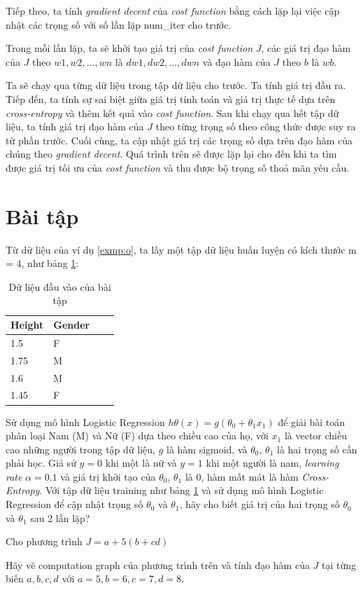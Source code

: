 Tiếp theo, ta tính \textit{gradient decent} của \textit{cost function} bằng cách lặp lại việc cập nhật các trọng số với số lần lặp num\_iter cho trước.

Trong mỗi lần lặp, ta sẽ khởi tạo giá trị của \textit{cost function} $J$, các giá trị đạo hàm của $J$ theo $w1, w2, ..., wn$ là $dw1, dw2, ..., dwn$ và đạo hàm của $J$ theo $b$ là $wb$.

Ta sẽ chạy qua từng dữ liệu trong tập dữ liệu cho trước. Ta tính giá trị đầu ra. Tiếp đến, ta tính sự sai biệt giữa giá trị tính toán và giá trị thực tế dựa trên \textit{cross-entropy} và thêm kết quả vào \textit{cost function}. Sau khi chạy qua hết tập dữ liệu, ta tính giá trị đạo hàm của $J$ theo từng trọng số theo công thức được suy ra từ phần trước. Cuối cùng, ta cập nhật giá trị các trọng số dựa trên đạo hàm của chúng theo \textit{gradient decent}. Quá trình trên sẽ được lặp lại cho đến khi ta tìm được giá trị tối ưu của \textit{cost function} và thu được bộ trọng số thoả mãn yêu cầu.

\newpage
\section{Bài tập}
\begin{exer}
Từ dữ liệu của ví dụ \ref{exmp:o}, ta lấy một tập dữ liệu huấn luyện có kích thước m = 4, như bảng \ref{tab:exercise}: 
\begin{table}[ht]
\centering
\begin{tabular}{|l|l|l|l|}
\hline
Height & Gender \\ \hline
1.5   & F \\ \hline
1.75  & M \\ \hline
1.6     & M \\ \hline
1.45  & F  \\ \hline
\end{tabular}
\caption{Dữ liệu đầu vào của bài tập}
\label{tab:exercise}
\end{table}

Sử dụng mô hình Logistic Regression $h\theta(x) = g(\theta_0 + \theta_1x_1)$ để giải bài toán phân loại Nam (M) và Nữ (F) dựa theo chiều cao của họ, với $x_1$ là vector chiều cao những người trong tập dữ liệu, $g$ là hàm sigmoid, và $\theta_0$, $\theta_1$ là hai trọng số cần phải học. Giả sử $y = 0$ khi một là nữ và $y = 1$ khi một người là nam, \textit{learning rate} $\alpha = 0.1$ và giá trị khởi tạo của $\theta_0$, $\theta_1$ là  $0$,  hàm mất mát là hàm \textit{Cross-Entropy}. Với tập dữ liệu training như bảng \ref{tab:exercise} và sử dụng mô hình Logistic Regression để cập nhật trọng số $\theta_0$ và $\theta_1$, hãy cho biết giá trị của hai trọng số $\theta_0$ và $\theta_1$ sau 2 lần lặp?
\end{exer}

\begin{exer}
Cho phương trình $J = a + 5(b + cd)$

Hãy vẽ computation graph của phương trình trên và tính đạo hàm của $J$ tại từng biến $a, b, c, d$ với $a=5, b=6, c=7, d=8$.
\end{exer}